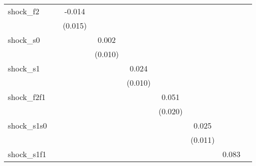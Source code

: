 {\begin{tabular}{l*{8}{c}}
\addlinespace
shock\_f2    &                     &      -0.014         &                     &                     &                     &                     &                     &                     \\
            &                     &     (0.015)         &                     &                     &                     &                     &                     &                     \\
\addlinespace
shock\_s0    &                     &                     &       0.002         &                     &                     &                     &                     &                     \\
            &                     &                     &     (0.010)         &                     &                     &                     &                     &                     \\
\addlinespace
shock\_s1    &                     &                     &                     &       0.024\sym{**} &                     &                     &                     &                     \\
            &                     &                     &                     &     (0.010)         &                     &                     &                     &                     \\
\addlinespace
shock\_f2f1  &                     &                     &                     &                     &       0.051\sym{**} &                     &                     &                     \\
            &                     &                     &                     &                     &     (0.020)         &                     &                     &                     \\
\addlinespace
shock\_s1s0  &                     &                     &                     &                     &                     &       0.025\sym{**} &                     &                     \\
            &                     &                     &                     &                     &                     &     (0.011)         &                     &                     \\
\addlinespace
shock\_s1f1  &                     &                     &                     &                     &                     &                     &       0.083\sym{**} &                     \\

\end{tabular}}
